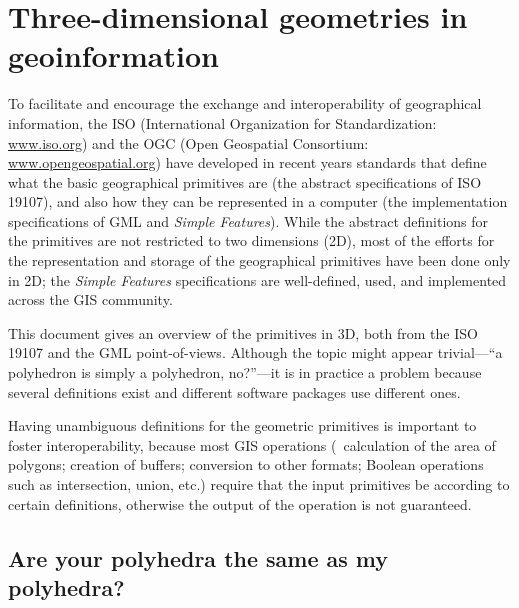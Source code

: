 
\setchapterpreamble[u]{\margintoc}

\graphicspath{{iso19107/}}
\renewcommand*{\thelesson}{3.2}

\chapter{Three-dimensional geometries in geoinformation}%
\label{chap:iso19107}

To facilitate and encourage the exchange and interoperability of geographical information, the ISO (International Organization for Standardization: \url{www.iso.org}) and the OGC (Open Geospatial Consortium: \url{www.opengeospatial.org}) have developed in recent years standards that define what the basic geographical primitives are (the abstract specifications of ISO 19107), and also how they can be represented in a computer (the implementation specifications of GML and \emph{Simple Features}). 
While the abstract definitions for the primitives are not restricted to two dimensions (2D), most of the efforts for the representation and storage of the geographical primitives have been done only in 2D; the \emph{Simple Features} specifications are well-defined, used, and implemented across the GIS community.

This document gives an overview of the primitives in 3D, both from the ISO 19107 and the GML point-of-views.
Although the topic might appear trivial---``a polyhedron is simply a polyhedron, no?''---it is in practice a problem because several definitions exist and different software packages use different ones.

Having unambiguous definitions for the geometric primitives is important to foster interoperability, because most GIS operations (\eg\ calculation of the area of polygons; creation of buffers; conversion to other formats; Boolean operations such as intersection, union, etc.) require that the input primitives be according to certain definitions, otherwise the output of the operation is not guaranteed.

%
\section[Same polyhedra?]{Are your polyhedra the same as my polyhedra?}%
\label{sec:definition}

